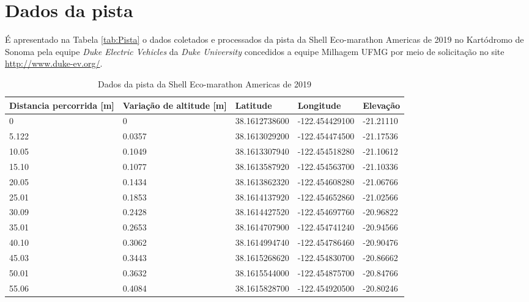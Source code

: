 \chapter{Dados da pista}

É apresentado na Tabela \ref{tab:Pista} o dados coletados e processados da pista da Shell Eco-marathon Americas de 2019
 no Kartódromo de Sonoma pela equipe \textit{Duke Electric Vehicles} da 
\textit{Duke University} concedidos a equipe Milhagem UFMG por meio de solicitação no site \url{http://www.duke-ev.org/}.

\begin{longtable}{p{2.5cm}p{2.5cm}p{3cm}p{3cm}p{2.5cm}}
    \caption{Dados da pista da Shell Eco-marathon Americas de 2019}\\
    \toprule
	\textbf{Distancia percorrida [m]} & \textbf{Variação de altitude [m]} & \textbf{Latitude} & \textbf{Longitude} &\textbf{Elevação}\\
    \hline
        0	  &       0	    &               38.1612738600  &   -122.454429100   &	-21.21110 \\
        5.122  &	     0.0357 &               38.1613029200  &   -122.454474500   &	-21.17536 \\
        10.05  &	     0.1049 &               38.1613307940  &   -122.454518280   &	-21.10612 \\
        15.10  &	     0.1077 &               38.1613587920  &   -122.454563700   &	-21.10336 \\
        20.05  &	     0.1434 &               38.1613862320  &   -122.454608280   &	-21.06766 \\
        25.01  &	     0.1853 &               38.1614137920  &   -122.454652860   &	-21.02566 \\
        30.09  &	     0.2428 &               38.1614427520  &   -122.454697760   &	-20.96822 \\
        35.01  &	     0.2653 &               38.1614707900  &   -122.454741240   &	-20.94566 \\
        40.10  &	     0.3062 &               38.1614994740  &   -122.454786460   &	-20.90476 \\
        45.03  &	     0.3443 &               38.1615268620  &   -122.454830700   &	-20.86662 \\
        50.01  &	     0.3632 &               38.1615544000  &   -122.454875700   &	-20.84766 \\
        55.06  &	     0.4084 &               38.1615828700  &   -122.454920500   &	-20.80246 \\

\end{longtable}

